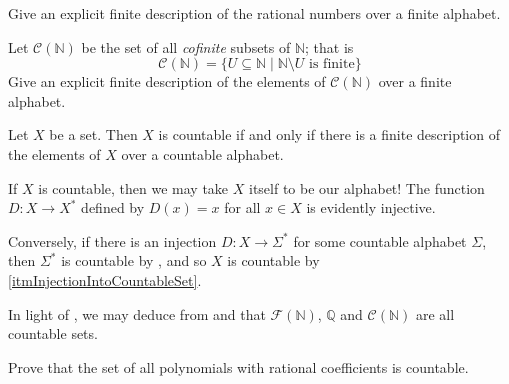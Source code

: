 \begin{exercise}
\label{exFiniteDescriptionOfQ}
Give an explicit finite description of the rational numbers over a finite alphabet.
\end{exercise}

\begin{exercise}
\label{exFiniteDescriptionOfCofiniteSubsetsOfN}
Let $\mathcal{C}(\mathbb{N})$ be the set of all \textit{cofinite} subsets of $\mathbb{N}$; that is
\[ \mathcal{C}(\mathbb{N}) = \{ U \subseteq \mathbb{N} \mid \mathbb{N} \setminus U \text{ is finite} \} \]
Give an explicit finite description of the elements of $\mathcal{C}(\mathbb{N})$ over a finite alphabet.
\end{exercise}

\begin{theorem}
\label{thmCountableIffFiniteDescription}
Let $X$ be a set. Then $X$ is countable if and only if there is a finite description of the elements of $X$ over a countable alphabet.
\end{theorem}

\begin{cproof}
If $X$ is countable, then we may take $X$ itself to be our alphabet! The function $D : X \to X^*$ defined by $D(x) = x$ for all $x \in X$ is evidently injective.

Conversely, if there is an injection $D : X \to \Sigma^*$ for some countable alphabet $\Sigma$, then $\Sigma^*$ is countable by , and so $X$ is countable by \ref{itmInjectionIntoCountableSet}.
\end{cproof}

\begin{example}
In light of , we may deduce from  and  that $\mathcal{F}(\mathbb{N})$, $\mathbb{Q}$ and $\mathcal{C}(\mathbb{N})$ are all countable sets.
\end{example}

\begin{exercise}
Prove that the set of all polynomials with rational coefficients is countable.
\end{exercise}

